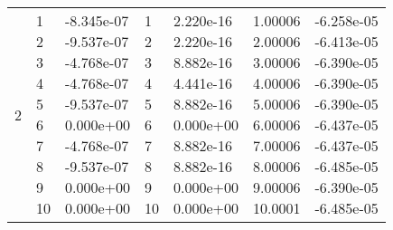 \documentclass[a4paper,12pt]{article}
\makeatletter
\newcommand{\tcell}[2][c]{\begin{tabu}[#1]{@{}c@{}}#2\end{tabu}}
\makeatother
\begin{document}
{{\begin{tabu}{|X[-1,c]||X[1,c]|X[1,c]||X[2,c]|X[1,c]||X[1,c]|X[1,c]|}
 & \tcell{1\\2\\3\\4\\5\\6\\7\\8\\9\\10} & \tcell{-8.345e-07\\-9.537e-07\\-4.768e-07\\-4.768e-07\\-9.537e-07\\0.000e+00\\-4.768e-07\\-9.537e-07\\0.000e+00\\0.000e+00} & \tcell{1\\2\\3\\4\\5\\6\\7\\8\\9\\10} & \tcell{2.220e-16\\2.220e-16\\8.882e-16\\4.441e-16\\8.882e-16\\0.000e+00\\8.882e-16\\8.882e-16\\0.000e+00\\0.000e+00} & \tcell{1.00006\\2.00006\\3.00006\\4.00006\\5.00006\\6.00006\\7.00006\\8.00006\\9.00006\\10.0001} & \tcell{-6.258e-05\\-6.413e-05\\-6.390e-05\\-6.390e-05\\-6.390e-05\\-6.437e-05\\-6.437e-05\\-6.485e-05\\-6.390e-05\\-6.485e-05} \\

\end{tabu}}}
\end{document}
